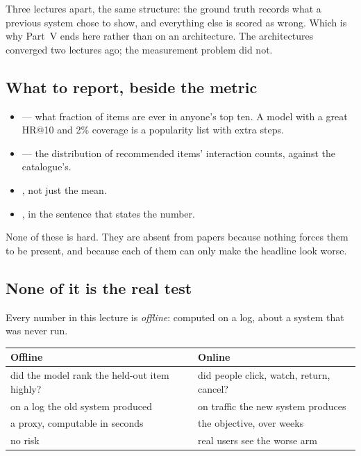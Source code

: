 \documentclass[11pt,a4paper]{article}
\begin{document}
Three lectures apart, the same structure: the ground truth records what a
previous system chose to show, and everything else is scored as wrong. Which is
why Part~V ends here rather than on an architecture. The architectures
converged two lectures ago; the measurement problem did not.

\subsection{What to report, beside the metric}

\begin{itemize}[leftmargin=*,nosep]
  \item {} --- what fraction of items are ever in
        anyone's top ten. A model with a great HR@10 and 2\% coverage is a
        popularity list with extra steps.
  \item {} --- the distribution of recommended items'
        interaction counts, against the catalogue's.
  \item {}, not just the mean.
  \item {}, in the sentence that states the number.
\end{itemize}

None of these is hard. They are absent from papers because nothing forces them
to be present, and because each of them can only make the headline look worse.

\subsection{None of it is the real test}

Every number in this lecture is \emph{offline}: computed on a log, about a
system that was never run.

\begin{center}
\small
\begin{tabular}{p{}p{}}
\toprule
\textbf{Offline} & \textbf{Online} \\
\midrule
did the model rank the held-out item highly? & did people click, watch, return,
cancel? \\
on a log the old system produced & on traffic the new system produces \\
a proxy, computable in seconds & the objective, over weeks \\
no risk & real users see the worse arm \\
\bottomrule
\end{tabular}
\end{center}
\end{document}
